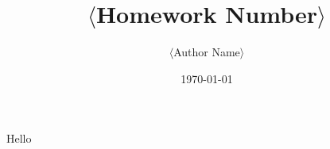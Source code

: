 \documentclass{article}
\title{$\langle$Homework Number$\rangle$}
\author{$\langle$Author Name$\rangle$}
\date{\today}
\begin{document}
\maketitle
	
Hello
\end{document}
